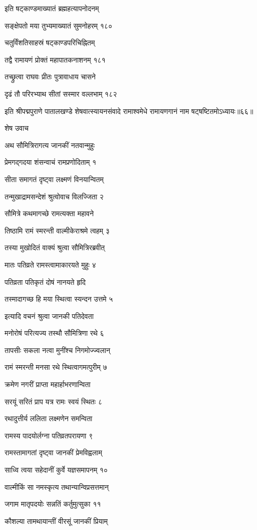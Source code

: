 इति षट्काण्डमाख्यातं ब्रह्महत्यापनोदनम्

सङ्क्षेपतो मया तुभ्यमाख्यातं सुमनोहरम् १८०

चतुर्विंशतिसाहस्रं षट्काण्डपरिचिह्नितम्

तद्वै रामायणं प्रोक्तं महापातकनाशनम् १८१

तच्छ्रुत्वा राघवः प्रीतः पुत्रावाधाय चासने

दृढं तौ परिरभ्याथ सीतां सस्मार वल्लभाम् १८२

इति श्रीपद्मपुराणे पातालखण्डे शेषवात्स्यायनसंवादे रामाश्वमेधे रामायणगानं नाम षट्षष्टितमोऽध्यायः॥६६॥


शेष उवाच

अथ सौमित्रिरागत्य जानकीं नतवान्मुहुः

प्रेमगद्गदया शंसन्वाचं रामप्रणोदिताम् १

सीता समागतं दृष्ट्वा लक्ष्मणं विनयान्वितम्

तन्मुखाद्रामसन्देशं श्रुत्वोवाच विलज्जिता २

सौमित्रे कथमागच्छे रामत्यक्ता महावने

तिष्ठामि रामं स्मरन्ती वाल्मीकेराश्रमे त्वहम् ३

तस्या मुखोदितं वाक्यं श्रुत्वा सौमित्रिरब्रवीत्

मातः पतिव्रते रामस्त्वामाकारयते मुहुः ४

पतिव्रता पतिकृतं दोषं नानयते हृदि

तस्मादागच्छ हि मया स्थित्वा स्यन्दन उत्तमे ५

इत्यादि वचनं श्रुत्वा जानकी पतिदेवता

मनोरोषं परित्यज्य तस्थौ सौमित्रिणा रथे ६

तापसीः सकला नत्वा मुनींश्च निगमोज्ज्वलान्

रामं स्मरन्ती मनसा रथे स्थित्वागमत्पुरीम् ७

क्रमेण नगरीं प्राप्ता महार्हाभरणान्विता

सरयूं सरितं प्राप यत्र रामः स्वयं स्थितः ८

रथादुत्तीर्य ललिता लक्ष्मणेन समन्विता

रामस्य पादयोर्लग्ना पतिव्रतपरायणा ९

रामस्तामागतां दृष्ट्वा जानकीं प्रेमविह्वलाम्

साध्वि त्वया सहेदानीं कुर्वे यज्ञसमापनम् १०

वाल्मीकिं सा नमस्कृत्य तथान्यान्विप्रसत्तमान्

जगाम मातृपदयोः सन्नतिं कर्तुमुत्सुका ११

कौशल्या तामथायान्तीं वीरसूं जानकीं प्रियाम्

